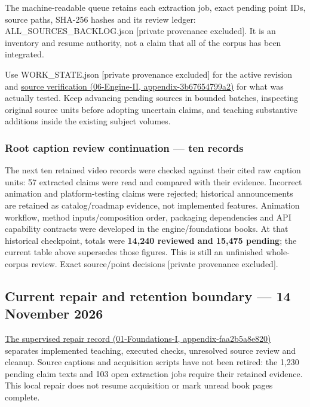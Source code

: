 The machine-readable queue retains each extraction job, exact pending point IDs, source paths, SHA-256 hashes and its review ledger: {ALL\_SOURCES\_BACKLOG.json {[}private provenance excluded{]}}. It is an inventory and resume authority, not a claim that all of the corpus has been integrated.

Use {WORK\_STATE.json {[}private provenance excluded{]}} for the active revision and \href{../06-Engine-II/main.pdf\#nameddest=appendix-3b67654799a2}{source verification (06-Engine-II, appendix-3b67654799a2)} for what was actually tested. Keep advancing pending sources in bounded batches, inspecting original source units before adopting uncertain claims, and teaching substantive additions inside the existing subject volumes.

\subsubsection{Root caption review continuation --- ten records}\label{appendix-ac1f51db5e9a-root-caption-review-continuation-ten-records}

The next ten retained video records were checked against their cited raw caption units: 57 extracted claims were read and compared with their evidence. Incorrect animation and platform-testing claims were rejected; historical announcements are retained as catalog/roadmap evidence, not implemented features. Animation workflow, method inputs/composition order, packaging dependencies and API capability contracts were developed in the engine/foundations books. At that historical checkpoint, totals were \textbf{14,240 reviewed and 15,475 pending}; the current table above supersedes those figures. This is still an unfinished whole-corpus review. {Exact source/point decisions {[}private provenance excluded{]}}.

\subsection{Current repair and retention boundary --- 14 November 2026}\label{appendix-ac1f51db5e9a-current-repair-and-retention-boundary-14-november-2026}

\href{../01-Foundations-I/main.pdf\#nameddest=appendix-faa2b5a8e820}{The supervised repair record (01-Foundations-I, appendix-faa2b5a8e820)} separates implemented teaching, executed checks, unresolved source review and cleanup. Source captions and acquisition scripts have not been retired: the 1,230 pending claim texts and 103 open extraction jobs require their retained evidence. This local repair does not resume acquisition or mark unread book pages complete.
